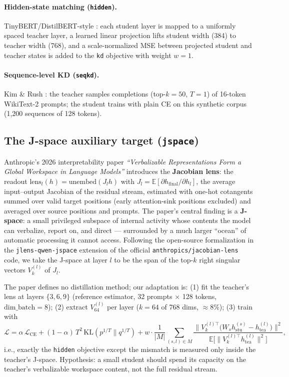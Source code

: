 \documentclass[11pt]{article}
\begin{document}
\paragraph{Hidden-state matching (\texttt{hidden}).}
TinyBERT/DistilBERT-style \cite{jiao2020tinybert,sanh2019distilbert}: each
student layer is mapped to a uniformly spaced teacher layer, a learned
linear projection lifts student width (384) to teacher width (768), and a
scale-normalized MSE between projected student and teacher states is added
to the \texttt{kd} objective with weight $w{=}1$.

\paragraph{Sequence-level KD (\texttt{seqkd}).}
Kim \& Rush \cite{kim2016sequence}: the teacher samples completions
(top-$k{=}50$, $T{=}1$) of 16-token WikiText-2 prompts; the student trains
with plain CE on this synthetic corpus (1{,}200 sequences of 128 tokens).

\subsection{The J-space auxiliary target (\texttt{jspace})}
\label{sec:jspace}
Anthropic's 2026 interpretability paper \emph{``Verbalizable
Representations Form a Global Workspace in Language Models''}
\cite{anthropic2026workspace} introduces the \textbf{Jacobian lens}: the
readout $\mathrm{lens}_l(h) = \mathrm{unembed}(J_l h)$ with $J_l =
\mathbb{E}[\partial h_{\mathrm{final}} / \partial h_l]$, the average
input--output Jacobian of the residual stream, estimated with one-hot
cotangents summed over valid target positions (early attention-sink
positions excluded) and averaged over source positions and prompts. The
paper's central finding is a \textbf{J-space}: a small privileged subspace
of internal activity whose contents the model can verbalize, report on,
and direct --- surrounded by a much larger ``ocean'' of automatic
processing it cannot access. Following the open-source formalization in
the \texttt{jlens-qwen-jspace} extension of the official
\texttt{anthropics/jacobian-lens} code, we take the J-space at layer $l$
to be the span of the top-$k$ right singular vectors $V_k^{(l)}$ of $J_l$.

The paper defines no distillation method; our adaptation is: (1) fit the
teacher's lens at layers $\{3,6,9\}$ (reference estimator, 32 prompts
$\times$ 128 tokens, $\mathrm{dim\_batch}=8$); (2) extract $V_{64}^{(l)}$
per layer ($k{=}64$ of 768 dims, $\approx$8\%); (3) train with
\begin{equation}
\mathcal{L} = \alpha\,\mathcal{L}_{\mathrm{CE}} + (1-\alpha)\,T^2\,
\mathrm{KL}(p^{1/T}\|q^{1/T}) + w \cdot \frac{1}{|M|}\sum_{(s,l)\in M}
\frac{\big\| V_k^{(l)\top}\!\big(W_s h^{(s)}_{\mathrm{stu}} -
h^{(l)}_{\mathrm{tea}}\big)\big\|^2}
{\mathbb{E}\big[\|V_k^{(l)\top} h^{(l)}_{\mathrm{tea}}\|^2\big]},
\end{equation}
i.e., exactly the \texttt{hidden} objective except the mismatch is
measured only inside the teacher's J-space. Hypothesis: a small student
should spend its capacity on the teacher's verbalizable workspace content,
not the full residual stream.
\end{document}
